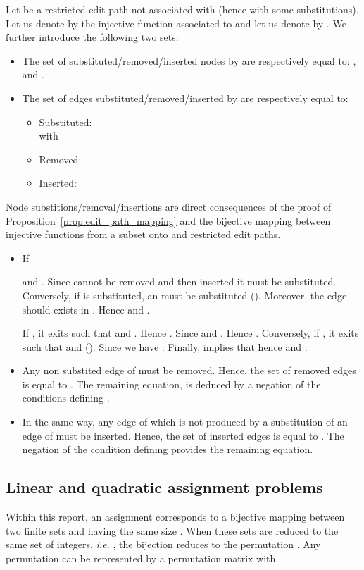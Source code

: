 \begin{proposition}\label{prop:defSRIsets}
  Let  be a restricted edit path not associated with 
  (hence with some substitutions). Let us denote by
   the injective function
  associated to  and let us denote  by
  . We further introduce the following two sets:
  
  \begin{itemize}
  \item The set of substituted/removed/inserted nodes by  are
    respectively equal to: ,  and
    .
  \item The set of edges substituted/removed/inserted by  are
    respectively equal to:
    \begin{itemize}
    \item Substituted: \\
      with 
    \item Removed:       
    \item Inserted: 
    \end{itemize}
  \end{itemize}
\end{proposition}
  Node substitions/removal/insertions are direct consequences of the
  proof of Proposition~\ref{prop:edit_path_mapping} and the bijective
  mapping between injective functions from a subset
   onto  and restricted edit paths. 
  \begin{itemize}
  \item If
    
    and . Since  cannot be
    removed and then inserted it must be substituted. Conversely, if
     is substituted,  an  must be substituted
    (). Moreover, the edge
     should exists in . Hence
     and . 

    If , it exits
     such that  and . Hence
    . Since 
    and . Hence
    .
    Conversely, if
    , it exits
     such that  and 
    (). Since  we have
    . Finally,  implies
    that  hence  and
    .
  \item Any non substited edge of  must be removed. Hence, the
    set of removed edges is equal to . The remaining
    equation, is deduced by a negation of the conditions defining
    .
  \item In the same way, any edge of  which is not produced by a
    substitution of an edge of  must be inserted. Hence, the set
    of inserted edges is equal to . The negation of the
    condition defining  provides the remaining equation.~~
  \end{itemize}
\subsection{Linear and quadratic assignment problems}\label{sec:mainDefAssignment}
Within this report, an assignment corresponds to a bijective mapping  between two finite sets
 and  having the same size .
When these sets are reduced to the same set of integers, \textit{i.e.} , the bijection  reduces to the permutation . Any permutation  can be represented by a  permutation matrix  with 

